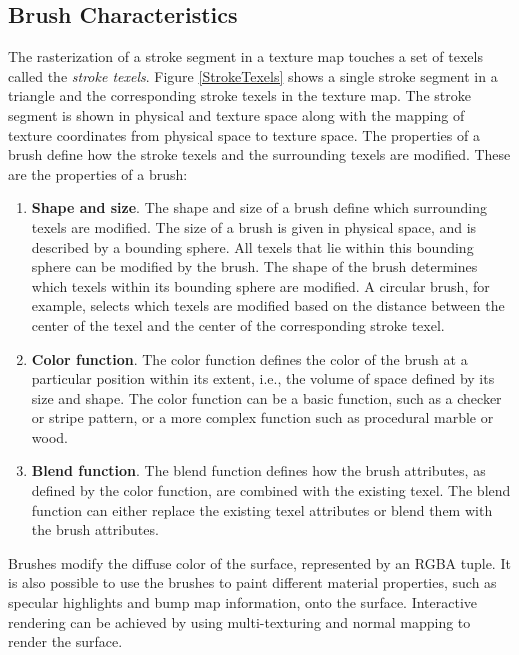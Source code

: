 \documentclass[10pt,twocolumn]{article}
\begin{document}
\subsection{Brush Characteristics}
\indent The rasterization of a stroke segment in a texture 
map touches a set of texels called the {\em stroke texels}.
Figure \ref{StrokeTexels} shows a single stroke segment in a triangle
and the corresponding stroke texels in the texture map.
The stroke segment is shown in physical and texture space along with the
mapping of texture coordinates from physical space to texture space. 
The properties of a brush define how the stroke texels and the surrounding texels
are modified.
These are the properties of a brush:
\begin{enumerate}
\item {\bf Shape and size}. 
The shape and size of a brush define which surrounding texels are modified.
The size of a brush is given in physical space, and is described by a bounding sphere. 
All texels that lie within this bounding sphere can be modified by the brush. 
The shape of the brush determines which texels within its bounding sphere 
are modified.
A circular brush, for example, selects which texels are modified based on the distance
between the center of the texel and the center of the corresponding stroke texel.

\item {\bf Color function}. The color function defines the color
of the brush at a particular position within its extent, i.e., the volume of space 
defined by its size and shape.
The color function can be a basic function, such as a checker or stripe pattern,
or a more complex function such as procedural marble or wood.

\item {\bf Blend function}. The blend function defines
how the brush attributes, as defined by the color function, are
combined with the existing texel. The blend function
can either replace the existing texel attributes or blend them 
with the brush attributes.

\end{enumerate}

Brushes modify the diffuse color of the surface, represented by an RGBA tuple.
It is also possible to use the brushes to paint different material properties,
such as specular highlights and bump map information, onto the surface.
Interactive rendering can be achieved by using multi-texturing 
and normal mapping to render the surface.
\end{document}
